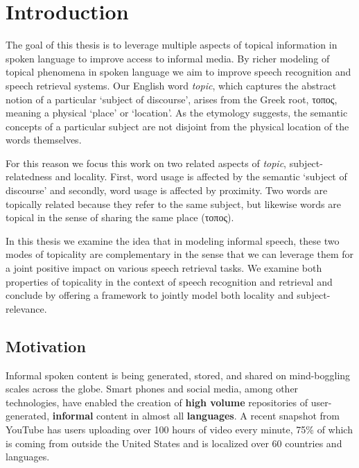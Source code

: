 \chapter{Introduction}
\label{sec:intro}



The goal of this thesis is to leverage multiple aspects of topical information in spoken language to improve access to informal media.  By richer modeling of topical phenomena in spoken language we aim to improve speech recognition and speech retrieval systems.  Our English word \textit{topic}, which captures the abstract notion of a particular `subject of discourse', arises from the Greek root, τοπος, meaning a physical `place' or `location'.  As the etymology suggests, the semantic concepts of a particular subject are not disjoint from the physical location of the words themselves.  

For this reason we focus this work on two related aspects of \textit{topic}, subject-relatedness and locality.  First, word usage is affected by the semantic `subject of discourse' and secondly, word usage is affected by proximity.  Two words are topically related because they refer to the same subject, but likewise words are topical in the sense of sharing the same place (τοπος).  


In this thesis we examine the idea that in modeling informal speech, these two modes of topicality are complementary in the sense that we can leverage them for a joint positive impact on various speech retrieval tasks.  We examine both properties of topicality in the context of speech recognition and retrieval and conclude by offering a framework to jointly model both locality and subject-relevance.

\section{Motivation}
Informal spoken content is being generated, stored, and shared on mind-boggling scales across the globe.  Smart phones and social media, among other technologies, have enabled the creation of \textbf{high volume} repositories of user-generated, \textbf{informal} content in almost all \textbf{languages}.  A recent snapshot from YouTube has users uploading over 100 hours of video every minute, 75\% of which is coming from outside the United States and is localized over 60 countries and languages\cite{youTubeStats}.  

